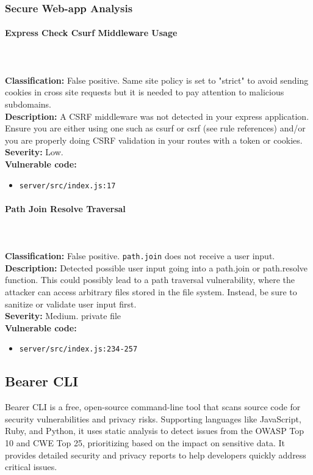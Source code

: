 \documentclass[]{article}
\begin{document}
\subsubsection{Secure Web-app Analysis}

\paragraph{Express Check Csurf Middleware Usage} \mbox{} \\ \\
\textbf{Classification:} False positive. Same site policy is set to "strict" to avoid sending cookies in cross site requests but it is needed to pay attention to malicious subdomains.\\
\textbf{Description:} A CSRF middleware was not detected in your express application. Ensure you are either using one such as csurf or csrf (see rule references) and/or you are properly doing CSRF validation in your routes with a token or cookies. \\ 
\textbf{Severity:} Low. \\ 
\textbf{Vulnerable code:}
\begin{itemize}
    \item \texttt{server/src/index.js:17}
\end{itemize}

\paragraph{Path Join Resolve Traversal} \mbox{} \\ \\
\textbf{Classification:} False positive. \texttt{path.join} does not receive a user input. \\
\textbf{Description:} Detected possible user input going into a path.join or path.resolve function. This could possibly lead to a path traversal vulnerability, where the attacker can access arbitrary files stored in the file system. Instead, be sure to sanitize or validate user input first. \\ 
\textbf{Severity:} Medium. private file\\ 
\textbf{Vulnerable code:}
\begin{itemize}
    \item \texttt{server/src/index.js:234-257}
\end{itemize}

\subsection{Bearer CLI}
Bearer CLI is a free, open-source command-line tool that scans source code for security vulnerabilities and privacy risks. Supporting languages like JavaScript, Ruby, and Python, it uses static analysis to detect issues from the OWASP Top 10 and CWE Top 25, prioritizing based on the impact on sensitive data. It provides detailed security and privacy reports to help developers quickly address critical issues.
\end{document}
